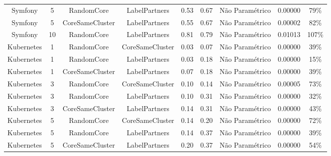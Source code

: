 \documentclass[12pt,openany,oneside,a4paper,english,brazil]{abntbibufjf}
\begin{document}
\begin{table}[htbp]
\begin{center}
{\begin{tabular}{|c|c|c|c|c|c|c|c|c|}
   Symfony          & 5          & RandomCore        & LabelPartners     & 0.53             & 0.67             & Não Paramétrico        & 0.00000          & 79\%               \\
   Symfony          & 5          & CoreSameCluster   & LabelPartners     & 0.55             & 0.67             & Não Paramétrico        & 0.00002          & 82\%               \\
   Symfony          & 10         & RandomCore        & LabelPartners     & 0.81             & 0.79             & Não Paramétrico        & 0.01013          & 107\%              \\
   Kubernetes       & 1          & RandomCore        & CoreSameCluster   & 0.03             & 0.07             & Não Paramétrico        & 0.00000          & 39\%               \\
   Kubernetes       & 1          & RandomCore        & LabelPartners     & 0.03             & 0.18             & Não Paramétrico        & 0.00000          & 15\%               \\
   Kubernetes       & 1          & CoreSameCluster   & LabelPartners     & 0.07             & 0.18             & Não Paramétrico        & 0.00000          & 39\%               \\
   Kubernetes       & 3          & RandomCore        & CoreSameCluster   & 0.10             & 0.14             & Não Paramétrico        & 0.00005          & 73\%               \\
   Kubernetes       & 3          & RandomCore        & LabelPartners     & 0.10             & 0.31             & Não Paramétrico        & 0.00000          & 32\%               \\
   Kubernetes       & 3          & CoreSameCluster   & LabelPartners     & 0.14             & 0.31             & Não Paramétrico        & 0.00000          & 43\%               \\
   Kubernetes       & 5          & RandomCore        & CoreSameCluster   & 0.14             & 0.20             & Não Paramétrico        & 0.00000          & 72\%               \\
   Kubernetes       & 5          & RandomCore        & LabelPartners     & 0.14             & 0.37             & Não Paramétrico        & 0.00000          & 39\%               \\
   Kubernetes       & 5          & CoreSameCluster   & LabelPartners     & 0.20             & 0.37             & Não Paramétrico        & 0.00000          & 54\%               \\

\end{tabular}}
\end{center}
\end{table}
\end{document}
